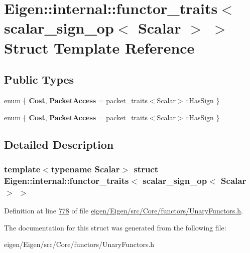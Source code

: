 \hypertarget{struct_eigen_1_1internal_1_1functor__traits_3_01scalar__sign__op_3_01_scalar_01_4_01_4}{}\section{Eigen\+:\+:internal\+:\+:functor\+\_\+traits$<$ scalar\+\_\+sign\+\_\+op$<$ Scalar $>$ $>$ Struct Template Reference}
\label{struct_eigen_1_1internal_1_1functor__traits_3_01scalar__sign__op_3_01_scalar_01_4_01_4}
\subsection*{Public Types}
\begin{DoxyCompactItemize}
\item 
\mbox{\label{struct_eigen_1_1internal_1_1functor__traits_3_01scalar__sign__op_3_01_scalar_01_4_01_4_abc34605947af1527d72299f700594866}} 
enum \{ {\bfseries Cost}, 
{\bfseries Packet\+Access} = packet\+\_\+traits$<$Scalar$>$\+:\+:Has\+Sign
 \}
\item 
\mbox{\label{struct_eigen_1_1internal_1_1functor__traits_3_01scalar__sign__op_3_01_scalar_01_4_01_4_a540b808635dd90ff460988c9ede622aa}} 
enum \{ {\bfseries Cost}, 
{\bfseries Packet\+Access} = packet\+\_\+traits$<$Scalar$>$\+:\+:Has\+Sign
 \}
\end{DoxyCompactItemize}


\subsection{Detailed Description}
\subsubsection*{template$<$typename Scalar$>$\newline
struct Eigen\+::internal\+::functor\+\_\+traits$<$ scalar\+\_\+sign\+\_\+op$<$ Scalar $>$ $>$}



Definition at line \hyperlink{eigen_2_eigen_2src_2_core_2functors_2_unary_functors_8h_source_l00778}{778} of file \hyperlink{eigen_2_eigen_2src_2_core_2functors_2_unary_functors_8h_source}{eigen/\+Eigen/src/\+Core/functors/\+Unary\+Functors.\+h}.



The documentation for this struct was generated from the following file\+:\begin{DoxyCompactItemize}
\item 
eigen/\+Eigen/src/\+Core/functors/\+Unary\+Functors.\+h\end{DoxyCompactItemize}
